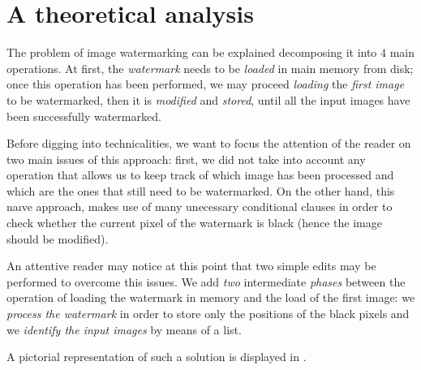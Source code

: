 \documentclass[12pt,a4paper,english]{article}
\begin{document}
\section{A theoretical analysis}\label{sec:theoretical}
The problem of image watermarking can be explained decomposing it into $4$ main operations. At first, the \emph{watermark} needs to be \emph{loaded} in main memory from disk; once this operation has been performed, we may proceed \emph{loading} the \emph{first image} to be watermarked, then it is \emph{modified} and \emph{stored}, until all the input images have been successfully watermarked.

Before digging into technicalities, we want to focus the attention of the reader on two main issues of this approach: first, we did not take into account any operation that allows us to keep track of which image has been processed and which are the ones that still need to be watermarked. On the other hand, this naıve approach, makes use of many unecessary conditional clauses in order to check whether the current pixel of the watermark is black (hence the image should be modified).

An attentive reader may notice at this point that two simple edits may be performed to overcome this issues. We add \emph{two} intermediate \emph{phases} between the operation of loading the watermark in memory and the load of the first image: we \emph{process the watermark} in order to store only the positions of the black pixels and we \emph{identify the input images} by means of a list.

A pictorial representation of such a solution is displayed in .
\end{document}
